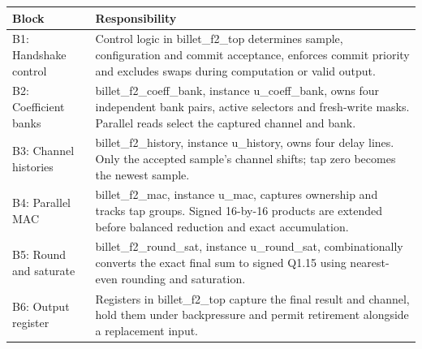 \documentclass[11pt,a4paper]{article}
\begin{document}
{\small\renewcommand{\arraystretch}{1.18}\begin{longtable}{@{}L{0.24\textwidth}|L{0.7\textwidth}@{}}\toprule

\textbf{Block} & \textbf{Responsibility}\\\midrule\endhead

B1: Handshake control & Control logic in billet\_\allowbreak{}f2\_\allowbreak{}top determines sample,\allowbreak{} configuration and commit acceptance,\allowbreak{} enforces commit priority and excludes swaps during computation or valid output.\\[2pt]\hline

B2: Coefficient banks & billet\_\allowbreak{}f2\_\allowbreak{}coeff\_\allowbreak{}bank,\allowbreak{} instance u\_\allowbreak{}coeff\_\allowbreak{}bank,\allowbreak{} owns four independent bank pairs,\allowbreak{} active selectors and fresh-write masks. Parallel reads select the captured channel and bank.\\[2pt]\hline

B3: Channel histories & billet\_\allowbreak{}f2\_\allowbreak{}history,\allowbreak{} instance u\_\allowbreak{}history,\allowbreak{} owns four delay lines. Only the accepted sample's channel shifts; tap zero becomes the newest sample.\\[2pt]\hline

B4: Parallel MAC & billet\_\allowbreak{}f2\_\allowbreak{}mac,\allowbreak{} instance u\_\allowbreak{}mac,\allowbreak{} captures ownership and tracks tap groups. Signed 16-by-16 products are extended before balanced reduction and exact accumulation.\\[2pt]\hline

B5: Round and saturate & billet\_\allowbreak{}f2\_\allowbreak{}round\_\allowbreak{}sat,\allowbreak{} instance u\_\allowbreak{}round\_\allowbreak{}sat,\allowbreak{} combinationally converts the exact final sum to signed Q1.15 using nearest-even rounding and saturation.\\[2pt]\hline

B6: Output register & Registers in billet\_\allowbreak{}f2\_\allowbreak{}top capture the final result and channel,\allowbreak{} hold them under backpressure and permit retirement alongside a replacement input.\\[2pt]\hline

\bottomrule\end{longtable}}
\end{document}
